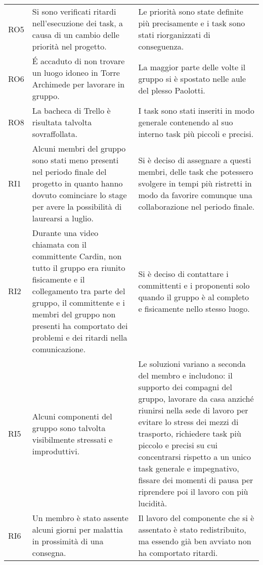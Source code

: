 \begin{longtable}{
		 >{\centering}p{}
		 >{}p{}
		 >{}p{}
	 }
	RO5 &
	Si sono verificati ritardi nell'esecuzione dei task, a causa di un cambio delle 
	priorità nel progetto. &
	Le priorità sono state definite più precisamente e i task sono stati riorganizzati
	di conseguenza.
	\tabularnewline
	
	RO6 &
	\'E accaduto di non trovare un luogo idoneo in Torre Archimede per lavorare in
	gruppo. &
	La maggior parte delle volte il gruppo si è spostato nelle aule del plesso Paolotti.
	\tabularnewline
	
	RO8 &
	La bacheca di Trello è risultata talvolta sovraffollata. &
	I task sono stati inseriti in modo generale contenendo al suo interno task più
	piccoli e precisi.
	\tabularnewline
	
	RI1 &
	Alcuni membri del gruppo sono stati meno presenti nel periodo finale del progetto in quanto hanno dovuto cominciare lo stage per avere la possibilità di laurearsi a luglio. &
	Si è deciso di assegnare a questi membri, delle task che potessero svolgere in tempi più ristretti in modo da favorire comunque una collaborazione nel periodo finale.	
	\tabularnewline
	
	RI2 &
	Durante una video chiamata con il committente Cardin, non tutto il gruppo era 
	riunito fisicamente e il collegamento tra parte del gruppo, il committente e 
	i membri del gruppo non presenti ha comportato dei problemi e dei ritardi nella
	comunicazione. &
	Si è deciso di contattare i committenti e i proponenti solo quando il gruppo 
	è al completo e fisicamente nello stesso luogo.	
	\tabularnewline
	
	RI5 &
	Alcuni componenti del gruppo sono talvolta visibilmente stressati e improduttivi. &
	Le soluzioni variano a seconda del membro e includono: il supporto dei compagni del gruppo,
	lavorare da casa anziché riunirsi nella sede di lavoro per evitare lo stress 
	dei mezzi di trasporto, richiedere task più piccolo e precisi su cui concentrarsi rispetto 
	a un unico task generale e impegnativo, fissare dei momenti di pausa per riprendere poi il
	lavoro con più lucidità.
	\tabularnewline
	
	RI6 &
	Un membro è stato assente alcuni giorni per malattia in prossimità di una consegna. & 
	Il lavoro del componente che si è assentato è stato redistribuito, ma essendo già
	ben avviato non ha comportato ritardi.
	\tabularnewline
	
		
\end{longtable}
